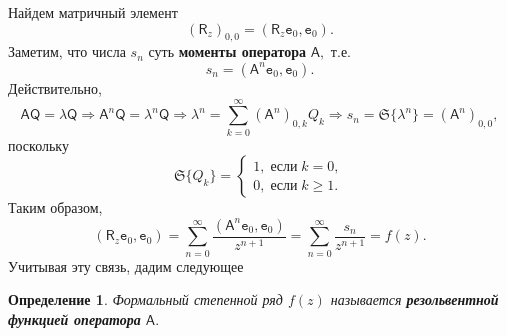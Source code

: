 \documentclass[12pt,a4paper]{article}
\theoremstyle{plain}   \newtheorem{Pro}{Задача}
\newtheorem{Def}{Определение}
\begin{document}
Найдем матричный элемент
$$
  (\mathsf{R}_z )_{0,0} =
  (\mathsf{R}_z \mathtt{e}_0 , \mathtt{e}_0 ).
$$
Заметим, что числа
$ s_n $
суть
{\bfseries моменты оператора}
$ \mathsf{A} , $
т.е.
$$
  s_n =(\mathsf{A}^n \mathtt{e}_0 , \mathtt{e}_0 ).
$$
Действительно,
$$
  \mathsf{A} \mathsf{Q}=\lambda \mathsf{Q} \Rightarrow
  \mathsf{A}^n \mathsf{Q} =\lambda ^n \mathsf{Q} \Rightarrow
  \lambda ^n = \sum _{k=0}^{\infty}
  ( \mathsf{A}^n )_{0,k} Q_k \Rightarrow
  s_n =\mathfrak{S} \{ \lambda ^n \} =
  (\mathsf{A} ^n )_{0,0},
$$
поскольку
\begin{equation*}
  \mathfrak{S} \{ Q_k \} =
    \begin{cases}
	  1, \; если \; k=0,\\
	  0, \; если \; k \geq 1.
	\end{cases}
\end{equation*}
Таким образом,
$$
  (\mathsf{R}_z \mathtt{e}_0 , \mathtt{e}_0 )=
  \sum _{n=0}^{\infty} \frac
  {( \mathsf{A}^n \mathtt{e}_0 , \mathtt{e}_0 )}
  {z^{n+1}}=
  \sum _{n=0}^{\infty}
  \frac{s_n}{z^{n+1}}=f(z).
$$
Учитывая эту связь, дадим следующее
\begin{Def}
Формальный степенной ряд
$ f(z) $
называется
{\bfseries резольвентной функцией оператора}
$ \mathsf{A}. $
\end{Def}
$ \; $
\\
\end{document}
